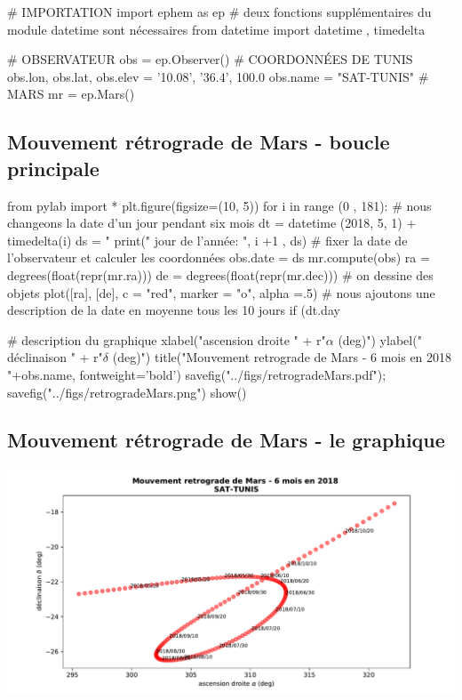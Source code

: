 \documentclass[%
oneside,                 %
final,                   %
10pt]{article}
\begin{document}
\bpycod
# IMPORTATION
import ephem as ep
# deux fonctions supplémentaires du module datetime sont nécessaires
from datetime import datetime , timedelta

# OBSERVATEUR
obs = ep.Observer()
# COORDONNÉES DE TUNIS
obs.lon, obs.lat, obs.elev = '10.08', '36.4', 100.0
obs.name = "SAT-TUNIS"
# MARS
mr = ep.Mars()
\epycod

\subsection{Mouvement rétrograde de Mars - boucle principale}
\bpycod
from pylab import *
plt.figure(figsize=(10, 5))
for i in range (0 , 181):
    # nous changeons la date d'un jour pendant six mois
    dt = datetime (2018, 5, 1) + timedelta(i)
    ds = "%
    print(" jour de l'année: ", i +1 , ds)
    # fixer la date de l'observateur et calculer les coordonnées
    obs.date = ds
    mr.compute(obs)
    ra = degrees(float(repr(mr.ra)))
    de = degrees(float(repr(mr.dec)))
    # on dessine des objets
    plot([ra], [de], c = "red", marker = "o", alpha =.5)
    # nous ajoutons une description de la date en moyenne tous les 10 jours
    if (dt.day %

# description du graphique
xlabel("ascension droite " + r"$\alpha$ (deg)")
ylabel(" déclinaison " + r"$\delta$ (deg)")
title("Mouvement retrograde de Mars - 6 mois en 2018 \n"+obs.name, fontweight='bold')
savefig("../figs/retrogradeMars.pdf"); savefig("../figs/retrogradeMars.png")
show()
\epycod
\subsection{Mouvement rétrograde de Mars - le graphique}


\vspace{6mm}

\centerline{\includegraphics[width=0.9\linewidth]{figs/retrogradeMars1.pdf}}
\end{document}
